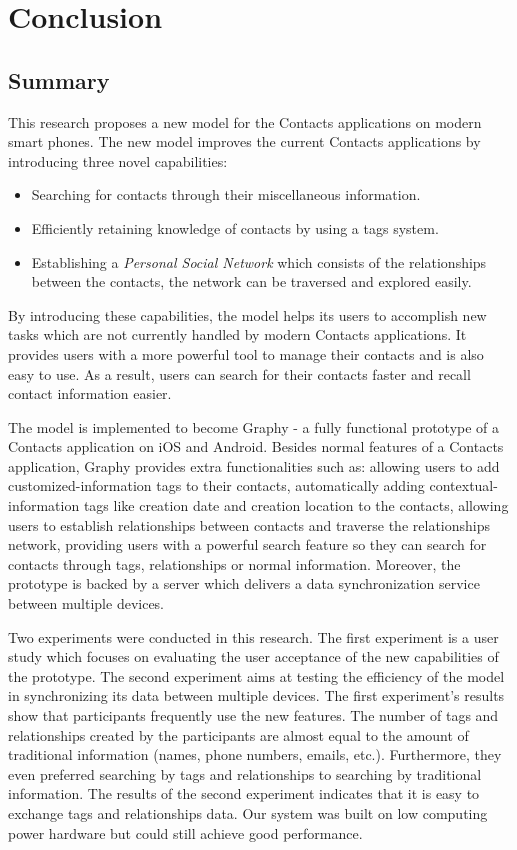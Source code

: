 \chapter{Conclusion}
\section{Summary}
This research proposes a new model for the Contacts applications on modern smart phones. The new model improves the current Contacts applications by introducing three novel capabilities:

\begin{itemize}
    \item {Searching for contacts through their miscellaneous information.}
    \item {Efficiently retaining knowledge of contacts by using a tags system.} 
    \item {Establishing a \textit{Personal Social Network} which consists of the relationships between the contacts, the network can be traversed and explored easily.}
\end{itemize}

By introducing these capabilities, the model helps its users to accomplish new tasks which are not currently handled by modern Contacts applications. It provides users with a more powerful tool to manage their contacts and is also easy to use. As a result, users can search for their contacts faster and recall contact information easier.

The model is implemented to become Graphy - a fully functional prototype of a Contacts application on iOS and Android. Besides normal features of a Contacts application, Graphy provides extra functionalities such as: allowing users to add customized-information tags to their contacts, automatically adding contextual-information tags like creation date and creation location to the contacts, allowing users to establish relationships between contacts and traverse the relationships network, providing users with a powerful search feature so they can search for contacts through tags, relationships or normal information. Moreover, the prototype is backed by a server which delivers a data synchronization service between multiple devices.

Two experiments were conducted in this research. The first experiment is a user study which focuses on evaluating the user acceptance of the new capabilities of the prototype. The second experiment aims at testing the efficiency of the model in synchronizing its data between multiple devices. The first experiment's results show that participants frequently use the new features. The number of tags and relationships created by the participants are almost equal to the amount of traditional information (names, phone numbers, emails, etc.). Furthermore, they even preferred searching by tags and relationships to searching by traditional information. The results of the second experiment indicates that it is easy to exchange tags and relationships data. Our system was built on low computing power hardware but could still achieve good performance.

